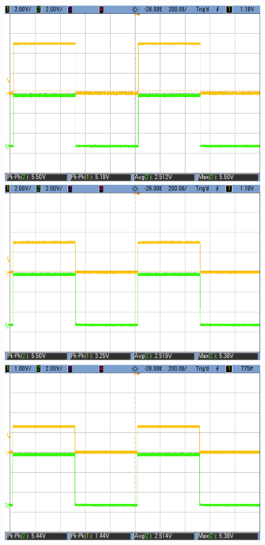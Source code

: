     \begin{figure}[h!]
        \centering
        \includegraphics[scale=0.19]{LS-HCT-5V.png}\hspace{1cm}
        \includegraphics[scale=0.19]{LS-HCT-3V.png}\\
		\vspace{0.2cm}
        \includegraphics[scale=0.19]{LS-HCT-1p5V.png}\hspace{1cm}

\end{figure}

